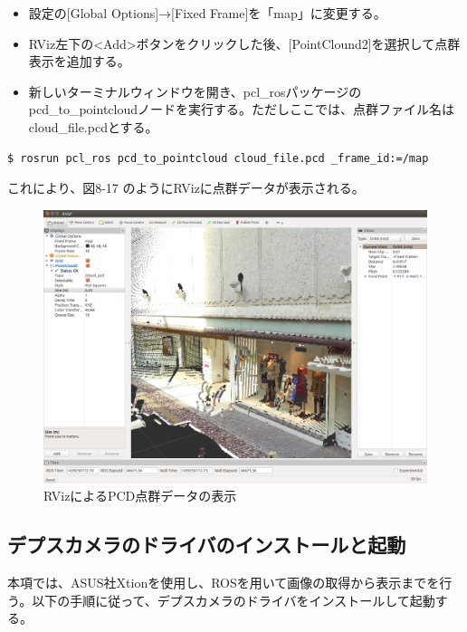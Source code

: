 \begin{itemize}
\item 設定の[Global Options]→[Fixed Frame]を「map」に変更する。
\item RViz左下の<Add>ボタンをクリックした後、[PointClound2]を選択して点群表示を追加する。
\item 新しいターミナルウィンドウを開き、pcl\_rosパッケージのpcd\_to\_pointcloudノードを実行する。ただしここでは、点群ファイル名はcloud\_file.pcdとする。
\end{itemize}

\begin{lstlisting}[language=ROS]
$ rosrun pcl_ros pcd_to_pointcloud cloud_file.pcd _frame_id:=/map
\end{lstlisting}

これにより、図8-17 のようにRVizに点群データが表示される。

\begin{figure}[ht]
  \centering
  \includegraphics[width=\columnwidth]{pictures/chapter8/pic_08_16.png}
  \caption{RVizによるPCD点群データの表示}
\end{figure}

\subsection{デプスカメラのドライバのインストールと起動}

本項では、ASUS社Xtionを使用し、ROSを用いて画像の取得から表示までを行う。以下の手順に従って、デプスカメラのドライバをインストールして起動する。

